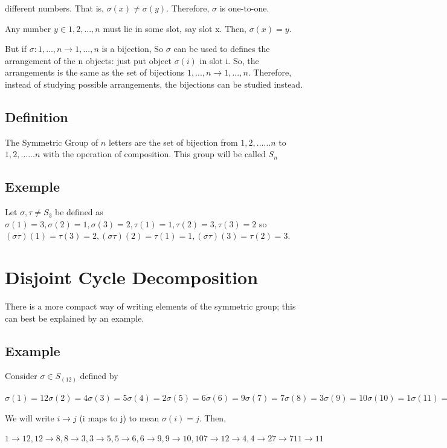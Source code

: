 different numbers. That is, $\sigma(x) \neq \sigma(y)$. Therefore, $\sigma$ is one-to-one.

Any number $y \in {1, 2, . . . , n}$ must lie in some slot, say slot x. Then, $\sigma(x) = y$.

But if $\sigma: {1, . . . , n} \rightarrow {1, . . . , n}$ is a bijection, So $\sigma$ can be used to defines the arrangement of the n
objects: just put object $\sigma(i)$ in slot i. So, the arrangements is the same as the set of
bijections ${1, . . . , n} \rightarrow {1, . . . , n}$. Therefore, instead of studying possible arrangements, the bijections can be studied instead.

\subsection{Definition}

The Symmetric Group of $n$ letters are the set of bijection from ${1,2,......n}$ to ${1,2,......n}$ with the operation of composition. This group will be called $S_n$

\subsection{Exemple}

Let $\sigma,\tau \neq S_3$ be defined as $\sigma(1)=3, \sigma(2)=1, \sigma(3)=2, \tau(1)=1,\tau(2)=3,\tau(3)=2$ so $(\sigma\tau)(1)=\tau(3)=2,(\sigma\tau)(2)=\tau(1)=1, (\sigma\tau)(3)=\tau(2)=3.$

\section{Disjoint Cycle Decomposition}

There is a more compact way of writing elements of the symmetric group; this can best be explained by an
example.

\subsection{Example} Consider $\sigma \in S_(12)$ defined by

	$\sigma(1) = 12 \sigma(2) = 4 \sigma(3) = 5 \sigma(4) = 2 \sigma(5) = 6 \sigma(6) = 9
	\sigma(7) = 7 \sigma(8) = 3 \sigma(9) = 10 \sigma(10) = 1 \sigma(11) = 11 \sigma(12) = 8$

We will write $i \rightarrow j$ (i maps to j) to mean $\sigma(i) = j$. Then,

	$1 \rightarrow 12, 12 \rightarrow 8, 8 \rightarrow 3, 3 \rightarrow 5, 5 \rightarrow 6, 6 \rightarrow 9, 9 \rightarrow 10, 10 7\rightarrow 1
	2 \rightarrow 4, 4 \rightarrow 2
	7 \rightarrow 7
	11 \rightarrow 11$


